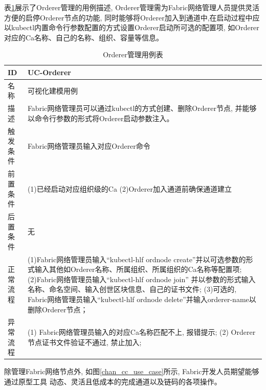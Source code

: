 表\ref{orderer_use_case}展示了Orderer管理的用例描述, Orderer管理需为Fabric网络管理人员提供灵活方便的启停Orderer节点的功能, 同时能够将Orderer加入到通道中,在启动过程中应以kubectl内置命令行参数配置的方式设置Orderer启动所可选的配置项, 如Orderer对应的Ca名称、自己的名称、组织、容量等信息。

{\footnotesize
\begin{longtable}[h]{m{60pt}|m{280pt}}
    \caption[Orderer管理用例表]{Orderer管理用例表} \label{orderer_use_case} \\
        \hline  
        ID&UC-Orderer\\
        \hline
        名称&可视化建模用例\\
        \hline
        描述&Fabric网络管理员可以通过kubectl的方式创建、删除Orderer节点, 并能够以命令行参数的形式将Orderer启动参数注入。\\
        \hline
        触发条件&Fabric网络管理员输入对应Orderer命令\\
        \hline
        前置条件& (1)已经启动对应组织级的Ca
        \newline (2)Orderer加入通道前确保通道建立\\
        \hline
        后置条件&无\\
        \hline
        正常流程& (1)Fabric网络管理员输入“kubectl-hlf ordnode create”并以可选参数的形式输入其他如Orderer名称、所属组织、所属组织的Ca名称等配置项;
        \newline (2)Fabric网络管理员输入“kubectl-hlf ordnode join” 并以参数的形式输入名称、命名空间、输入创世区块信息、自己的证书文件;
        \newline (3)可选的, Fabric网络管理员输入“kubectl-hlf ordnode delete”并输入orderer-name以删除Orderer节点；\\
        \hline 
        异常流程& (1) Fabric网络管理员输入的对应Ca名称匹配不上, 报错提示;
        \newline (2) Orderer节点证书文件验证不通过, 禁止加入; \\
        \hline
    \end{longtable} 
}


除管理Fabric网络节点外, 如图\ref{chan_cc_use_case}所示, Fabric开发人员期望能够通过原型工具
动态、灵活且低成本的完成通道以及链码的各项操作。

